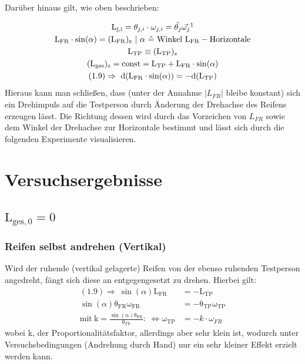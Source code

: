 \documentclass{include/protokollclass}
\begin{document}
    Darüber hinaus gilt, wie oben beschrieben:
    
    \begin{gather}
        \mathrm{L_{j,i}}=\theta_{j,i} \cdot \omega_{j,i}= \hat{\theta_j}\vec{\omega_j}\mathrm{\footnotemark} \\
        \mathrm{L_{FR}}\cdot \sin(\alpha) = \mathrm{(L_{FR})_z}\ |\ \alpha\  \hat{=}\  \mathrm{Winkel\ L_{FR}-Horizontale}\\
        \mathrm{L_{TP}} \equiv \mathrm{(L_{TP})_z} \\
        \mathrm{(L_{ges})_z} = \mathrm{const} = \mathrm{L_{TP}} + \mathrm{L_{FR}}\cdot \sin(\alpha) \\
        \mathrm{(1.9)}\Rightarrow\ \mathrm{d(L_{FR}\cdot \sin(\alpha))}=\mathrm{-d(L_{TP})}
    \end{gather}
    Hieraus kann man schließen, dass (unter der Annahme $|L_{FR}|$ bleibe konstant) sich ein Drehimpuls auf die Testperson durch Änderung der Drehachse des Reifens erzeugen lässt. Die Richtung dessen wird durch das Vorzeichen von $L_{FR}$ sowie dem Winkel der Drehachse zur Horizontale bestimmt und lässt sich durch die folgenden Experimente visualisieren.
    \newpage
    \section{Versuchsergebnisse}
    \subsection{$\mathrm{L_{ges,0}=0}$}
    \subsubsection{Reifen selbst andrehen (Vertikal)}
    Wird der ruhende (vertikal gelagerte) Reifen von der ebenso ruhenden Testperson angedreht, fängt sich diese an entgegengesetzt zu drehen. Hierbei gilt:
    \begin{align}
        \mathrm{(1.9)}\Rightarrow\ \sin(\alpha)\mathrm{L_{FR}} &= -\mathrm{L_{TP}} \\
        \sin(\alpha) \mathrm{\theta_{FR}} \mathrm{\omega_{FR}} &= -\mathrm{\theta_{TP}}\mathrm{\omega_{TP}} \\
        \mathrm{mit\ k=\frac{\sin(\alpha)\theta_{FR}}{\theta_{TP}}}:\ \Leftrightarrow \mathrm{\omega_{TP}} &= -k\cdot \omega_{FR}
    \end{align}
    wobei k, der Proportionalitätsfaktor, allerdings aber sehr klein ist, wodurch unter Versuchsbedingungen (Andrehung durch Hand) nur ein sehr kleiner Effekt erzielt werden kann.
\end{document}
